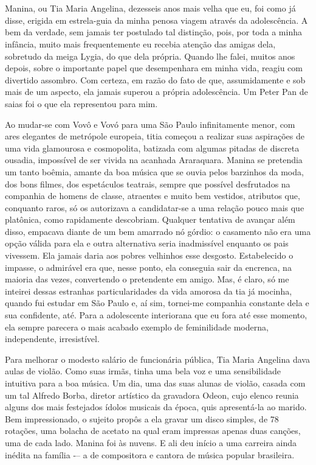 \chapter{}
Manina, ou Tia Maria Angelina, dezesseis anos mais velha que eu, foi como já disse, erigida em estrela-guia da minha penosa viagem através da adolescência.
A bem da verdade, sem jamais ter postulado tal distinção, pois, por toda a minha infância, muito mais frequentemente eu recebia atenção das amigas dela, sobretudo da meiga Lygia, do que dela própria.
Quando lhe falei, muitos anos depois, sobre o importante papel que desempenhara em minha vida, reagiu com divertido assombro.
Com certeza, em razão do fato de que, assumidamente e sob mais de um aspecto, ela jamais superou a própria adolescência.
Um Peter Pan de saias foi o que ela representou para mim.

Ao mudar-se com Vovô e Vovó para uma São Paulo infinitamente menor, com ares elegantes de metrópole europeia, titia começou a realizar suas aspirações de uma vida glamourosa e cosmopolita, batizada com algumas pitadas de discreta ousadia, impossível de ser vivida na acanhada Araraquara.
Manina se pretendia um tanto boêmia, amante da boa música que se ouvia pelos barzinhos da moda, dos bons filmes, dos espetáculos teatrais, sempre que possível desfrutados na companhia de homens de classe, atraentes e muito bem vestidos, atributos que, conquanto raros, só os autorizava a candidatar-se a uma relação pouco mais que platônica, como rapidamente descobriam.
Qualquer tentativa de avançar além disso, empacava diante de um bem amarrado nó górdio: o casamento não era uma opção válida para ela e outra alternativa seria inadmissível enquanto os pais vivessem.
Ela jamais daria aos pobres velhinhos esse desgosto.
Estabelecido o impasse, o admirável era que, nesse ponto, ela conseguia sair da encrenca, na maioria das vezes, convertendo o pretendente em amigo.
Mas, é claro, só me inteirei dessas estranhas particularidades da vida amorosa da tia já mocinha, quando fui estudar em São Paulo e, aí sim, tornei-me companhia constante dela e sua confidente, até.
Para a adolescente interiorana que eu fora até esse momento, ela sempre parecera o mais acabado exemplo de feminilidade moderna, independente, irresistível.


Para melhorar o modesto salário de funcionária pública, Tia Maria Angelina dava aulas de violão.
Como suas irmãs, tinha uma bela voz e uma sensibilidade intuitiva para a boa música.
Um dia, uma das suas alunas de violão, casada com um tal Alfredo Borba, diretor artístico da gravadora Odeon, cujo elenco reunia alguns dos mais festejados ídolos musicais da época, quis apresentá-la ao marido.
Bem impressionado, o sujeito propôs a ela gravar um disco simples, de 78 rotações, uma bolacha de acetato na qual eram impressas apenas duas canções, uma de cada lado.
Manina foi às nuvens.
E ali deu início a uma carreira ainda inédita na família -– a de compositora e cantora de música popular brasileira.


